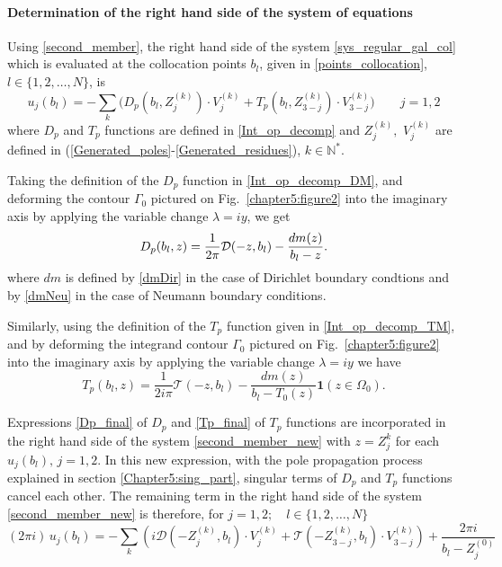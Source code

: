 \paragraph{Determination of the right hand side of the system of equations}

Using \eqref{second_member}, the right hand side of the system \eqref{sys_regular_gal_col} which is evaluated at the collocation points $b_l$, given in \eqref{points_collocation}, $l \in \{ 1,2, \ldots, N \}$, is 
\begin{equation}
\label{second_member_new}
u_j(b_l) = -\sum_k \Big( D_p(b_l,Z_j^{(k)})\cdot V_j^{(k)}+ T_p(b_l,Z_{3-j}^{(k)})\cdot V_{3-j}^{(k)}\Big) \qquad j=1,2
\end{equation}
where $D_p$ and $T_p$ functions are defined in \eqref{Int_op_decomp} and $Z_j^{(k)},\, \, V_j^{(k)}$ are defined in (\ref{Generated_poles}-\ref{Generated_residues}), $k \in \mathbb{N}^*$. 

Taking the definition of the $D_p$ function in \eqref{Int_op_decomp_DM}, and deforming the contour $\Gamma_0$ pictured on Fig.~\ref{chapter5:figure2} into the imaginary axis by applying the variable change $\lambda = iy$, we get
\begin{equation}
\label{Dp_final}
D_p(b_l,z) = {1\over 2\pi}\mathcal D(-z,b_l)-  {dm(z)\over b_l-z}.
\end{equation}
where $dm$ is defined by \eqref{dmDir} in the case of Dirichlet boundary condtions and by \eqref{dmNeu} in the case of Neumann boundary conditions.

Similarly, using the definition of the $T_p$ function given in \eqref{Int_op_decomp_TM}, and by deforming the integrand contour $\Gamma_0$ pictured on Fig.~\ref{chapter5:figure2} into the imaginary axis by applying the variable change $\lambda = iy$ we have
\begin{equation}
\label{Tp_final}
T_p(b_l,z) = 
\dfrac{1}{2i\pi} \mathcal T(-z,b_l) - \dfrac{dm(z)}{b_l - T_0(z)} \mathbf{1} (z \in \Omega_0) .
\end{equation}

Expressions \eqref{Dp_final} of $D_p$ and \eqref{Tp_final} of $T_p$ functions are incorporated in the right hand side of the system \eqref{second_member_new} with $z = Z_j^k$ for each $u_j(b_l), \, j=1,2$. In this new expression, with the pole propagation process explained in section \ref{Chapter5:sing_part}, singular terms of $D_p$ and $T_p$ functions cancel each other. The remaining term in the right hand side of the system \eqref{second_member_new} is therefore, for $j=1,2; \quad l \in \{ 1,2, \ldots, N \}$
\begin{equation}
(2\pi i) \, u_j(b_l) =  - \sum_k \left( i \mathcal D(-Z_j^{(k)},b_l)\cdot V_j^{(k)}  + \mathcal T(-Z_{3-j}^{(k)},b_l) 
\cdot V_{3-j}^{(k)}  \right) +  \dfrac{2\pi i}{b_l - Z_j^{(0)}}
\end{equation}

